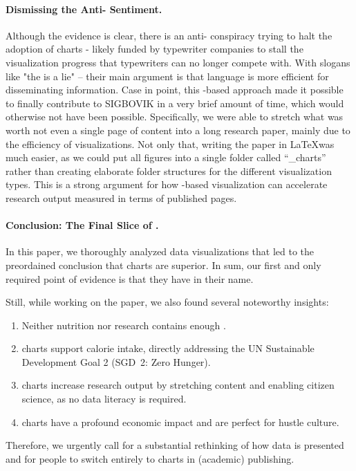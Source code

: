 \documentclass[11pt,letterpaper]{article}
\def\pie{}%
\newcommand{\pie}{{\fontspec{Symbola}\char"1F967}}
\begin{document}
\paragraph{Dismissing the Anti-\pie{} Sentiment.}
Although the evidence is clear, there is an anti-\pie{} conspiracy trying to halt the adoption of \pie{}charts - likely funded by typewriter companies to stall the visualization progress that typewriters can no longer compete with. With slogans like "the \pie{} is a lie" -- their main argument is that language is more efficient for disseminating information. Case in point, this \pie{}-based approach made it possible to finally contribute to SIGBOVIK in a very brief amount of time, which would otherwise not have been possible. Specifically, we were able to stretch what was worth not even a single page of content into a long research paper, mainly due to the efficiency of \pie{} visualizations. Not only that, writing the paper in \LaTeX was much easier, as we could put all figures into a single folder called ``\pie{}\_charts'' rather than creating elaborate folder structures for the different visualization types. This is a strong argument for how \pie{}-based visualization can accelerate research output measured in terms of published pages.



\paragraph{Conclusion: The Final Slice of \pie{}.}


In this paper, we thoroughly analyzed data visualizations that led to the preordained conclusion that \pie{}charts are superior. In sum, our first and only required point of evidence is that they have \pie{} in their name.

\noindent
Still, while working on the paper, we also found several noteworthy insights:
\begin{enumerate}
    \item Neither nutrition nor research contains enough \pie{}.
    \item \pie{}charts support calorie intake, directly addressing the UN Sustainable Development Goal 2 (SGD~2: Zero Hunger).
    \item \pie{}charts increase research output by stretching content and enabling citizen science, as no data literacy is required.
    \item \pie{}charts have a profound economic impact and are perfect for hustle culture.
\end{enumerate}
Therefore, we urgently call for a substantial rethinking of how data is presented and for people to switch entirely to \pie{} charts in (academic) publishing.
\end{document}
